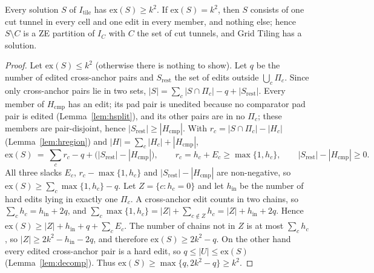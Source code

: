 \begin{theorem}[Soundness]\label{thm:hS}
Every solution $S$ of $I_{\mathrm{tile}}$ has $\mathrm{ex}(S)\ge k^2$. If $\mathrm{ex}(S)=k^2$, then $S$ consists of one cut tunnel in every cell and one edit in every member, and nothing else; hence $S\setminus C$ is a ZE partition of $I_C$ with $C$ the set of cut tunnels, and Grid Tiling has a solution.
\end{theorem}
\begin{proof}
Let $\mathrm{ex}(S)\le k^2$ (otherwise there is nothing to show). Let $q$ be the number of edited cross-anchor pairs and $S_{\mathrm{rest}}$ the set of edits outside $\bigcup_c\Pi_c$. Since only cross-anchor pairs lie in two sets, $|S|=\sum_c|S\cap\Pi_c|-q+|S_{\mathrm{rest}}|$. Every member of $H_{\mathrm{cmp}}$ has an edit; its pad pair is unedited because no comparator pad pair is edited (Lemma~\ref{lem:hsplit}), and its other pairs are in no $\Pi_c$; these members are pair-disjoint, hence $|S_{\mathrm{rest}}|\ge|H_{\mathrm{cmp}}|$. With $r_c=|S\cap\Pi_c|-|H_c|$ (Lemma~\ref{lem:hregion}) and $|H|=\sum_c|H_c|+|H_{\mathrm{cmp}}|$,
\[
\mathrm{ex}(S)\ =\ \sum_c r_c-q+\bigl(|S_{\mathrm{rest}}|-|H_{\mathrm{cmp}}|\bigr),\qquad r_c=h_c+E_c\ge\max\{1,h_c\},\qquad |S_{\mathrm{rest}}|-|H_{\mathrm{cmp}}|\ge0 .
\]
All three slacks $E_c$, $r_c-\max\{1,h_c\}$ and $|S_{\mathrm{rest}}|-|H_{\mathrm{cmp}}|$ are non-negative, so $\mathrm{ex}(S)\ge\sum_c\max\{1,h_c\}-q$.
Let $Z=\{c:h_c=0\}$ and let $h_{\mathrm{in}}$ be the number of hard edits lying in exactly one $\Pi_c$. A cross-anchor edit counts in two chains, so $\sum_ch_c=h_{\mathrm{in}}+2q$, and $\sum_c\max\{1,h_c\}=|Z|+\sum_{c\notin Z}h_c=|Z|+h_{\mathrm{in}}+2q$. Hence $\mathrm{ex}(S)\ge|Z|+h_{\mathrm{in}}+q+\sum_cE_c$. The number of chains not in $Z$ is at most $\sum_ch_c$, so $|Z|\ge2k^2-h_{\mathrm{in}}-2q$, and therefore $\mathrm{ex}(S)\ge2k^2-q$. On the other hand every edited cross-anchor pair is a hard edit, so $q\le|U|\le\mathrm{ex}(S)$ (Lemma~\ref{lem:decomp}). Thus $\mathrm{ex}(S)\ge\max\{q,2k^2-q\}\ge k^2$.


\end{proof}
